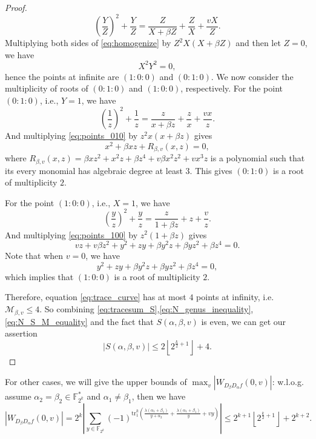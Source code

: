 \documentclass[8pt,oneside]{article}
\newcommand{\0}{\textbf{0}}
\newcommand{\1}{\textbf{1}}
\newcommand{\tr}{\mathrm{tr}_1^k}
\newcommand{\F}{\mathbb{F}}
\newtheorem{proof}{Proof}
\begin{document}
\begin{proof}
\begin{equation}
            \left( \frac{Y}{Z} \right)^2+\frac{Y}{Z}=\frac{Z}{X+\beta Z}+\frac{Z}{X}+\frac{vX}{Z}.
        \end{equation}
        Multiplying both sides of \eqref{eq:homogenize} by $ Z^2X\left( X+\beta Z \right) $ and then let $ Z=0 $, 
        we have 
        \[X^2Y^2=0,\]
        hence the points at infinite are $ (1:0:0) $ and $ (0:1:0) $. 
        We now consider the multiplicity of roots of $ (0 : 1 : 0) $ and $ (1 : 0 : 0) $, respectively. 
        For the point $ (0 : 1 : 0 ) $, i.e., $ Y = 1 $, we have
        \begin{equation}\label{eq:points_010}
            \left( \frac{1}{z} \right)^2+\frac{1}{z}=\frac{z}{x+\beta z}+\frac{z}{x}+\frac{vx}{z}.
        \end{equation}
        And multiplying \eqref{eq:points_010} by $ z^2x(x+\beta z) $ gives 
        \[x^2+\beta xz+R_{\beta,v}(x,z)=0,\]
        where $ R_{\beta,v}(x,z)=\beta xz^2+x^2z+\beta z^4+v\beta x^2z^2+vx^3z $ is a polynomial 
        such that its every monomial has algebraic degree at least $ 3 $. 
        This gives $ (0 : 1 : 0) $ is a root of multiplicity $ 2 $. 
        
        For the point $ (1 : 0 : 0) $, i.e., $ X = 1 $, we have
        \begin{equation}\label{eq:points_100}
            \left( \frac{y}{z} \right)^2+\frac{y}{z}=\frac{z}{1+\beta z}+z+\frac{v}{z}.
        \end{equation}
        And multiplying \eqref{eq:points_100} by $ z^2(1+\beta z) $ gives 
        \[vz+v\beta z^2+y^2+zy+\beta y^2z+\beta yz^2+\beta z^4=0.\]
        Note that when $ v=0 $, we have 
        \[y^2+zy+\beta y^2z+\beta yz^2+\beta z^4=0,\]
        which implies that $ (1:0:0) $ is a root of multiplicity $ 2 $. 

        Therefore, equation \eqref{eq:trace_curve} has at most $ 4 $ points at infinity, i.e. 
        $ \mathcal{M}_{\beta,v}\le4 $. 
        So combining \eqref{eq:tracesum_S},\eqref{eq:N_genus_inequality},\eqref{eq:N_S_M_equality} and the fact that 
        $ S(\alpha,\beta,v) $ is even, we can get our assertion
        \[\left\lvert S(\alpha,\beta,v)\right\rvert \le 2\left\lfloor 2^{\frac{k}{2}+1}\right\rfloor+4.\]
    \end{proof}
    
    For other cases, we will give the upper bounds of $ \max_{v}|W_{D_{\beta}D_{\alpha}f}(0,v)| $: 
    w.l.o.g. assume $ \alpha_2=\beta_2\in\F_{2^k}^* $ and $ \alpha_1\ne\beta_1 $, then we have 
    \[\left\lvert W_{D_{\beta}D_{\alpha}f}(0,v)\right\rvert =2^k\left\lvert \sum_{y\in\F_{2^k}}(-1)^{\tr\left(\frac{\lambda(\alpha_1+\beta_1)}{y+\alpha_2}+\frac{\lambda(\alpha_1+\beta_1)}{y}+vy\right)}\right\rvert\le 2^{k+1}\left\lfloor 2^{\frac{k}{2}+1}\right\rfloor+2^{k+2}.\]
\end{document}
